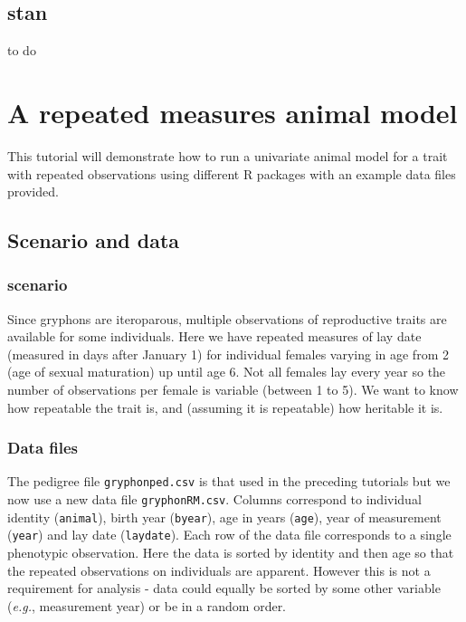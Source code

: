 \documentclass[
  12pt,
]{book}
\begin{document}
\hypertarget{stan-1}{%
\section{stan}\label{stan-1}}

to do

\hypertarget{rep_measures}{%
\chapter{A repeated measures animal model}\label{rep_measures}}

This tutorial will demonstrate how to run a univariate animal model for a trait with repeated observations using different R packages with an example data files provided.

\hypertarget{scenario-and-data-2}{%
\section{Scenario and data}\label{scenario-and-data-2}}

\hypertarget{scenario-2}{%
\subsection{scenario}\label{scenario-2}}

Since gryphons are iteroparous, multiple observations of reproductive traits are available for some individuals. Here we have repeated measures of lay date (measured in days after January 1) for individual females varying in age from 2 (age of sexual maturation) up until age 6. Not all females lay every year so the number of observations per female is variable (between 1 to 5). We want to know how repeatable the trait is, and (assuming it is repeatable) how heritable it is.

\hypertarget{data-files-2}{%
\subsection{Data files}\label{data-files-2}}

The pedigree file \texttt{gryphonped.csv} is that used in the preceding tutorials but we now use a new data file \texttt{gryphonRM.csv}. Columns correspond to individual identity (\texttt{animal}), birth year (\texttt{byear}), age in years (\texttt{age}), year of measurement (\texttt{year}) and lay date (\texttt{laydate}).
Each row of the data file corresponds to a single phenotypic observation. Here the data is sorted by identity and then age so that the repeated observations on individuals are apparent. However this is not a requirement for analysis - data could equally be sorted by some other variable (\emph{e.g.}, measurement year) or be in a random order.
\end{document}
